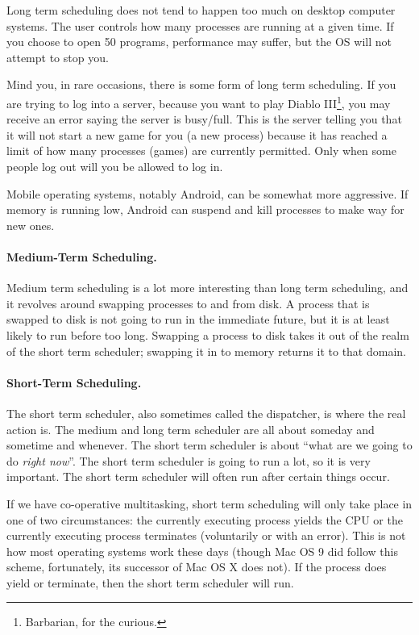 Long term scheduling does not tend to happen too much on desktop computer systems. The user controls how many processes are running at a given time. If you choose to open 50 programs, performance may suffer, but the OS will not attempt to stop you.

Mind you, in rare occasions, there is some form of long term scheduling. If you are trying to log into a server, because you want to play Diablo III\footnote{Barbarian, for the curious.}, you may receive an error saying the server is busy/full. This is the server telling you that it will not start a new game for you (a new process) because it has reached a limit of how many processes (games) are currently permitted. Only when some people log out will you be allowed to log in.

Mobile operating systems, notably Android, can be somewhat more aggressive. If memory is running low, Android can suspend and kill processes to make way for new ones.

\paragraph{Medium-Term Scheduling.}
Medium term scheduling is a lot more interesting than long term scheduling, and it revolves around swapping processes to and from disk. A process that is swapped to disk is not going to run in the immediate future, but it is at least likely to run before too long. Swapping a process to disk takes it out of the realm of the short term scheduler; swapping it in to memory returns it to that domain.

\paragraph{Short-Term Scheduling.}
The short term scheduler, also sometimes called the dispatcher, is where the real action is. The medium and long term scheduler are all about someday and sometime and whenever. The short term scheduler is about ``what are we going to do \textit{right now}''. The short term scheduler is going to run a lot, so it is very important. The short term scheduler will often run after certain things occur. 

If we have co-operative multitasking, short term scheduling will only take place in one of two circumstances: the currently executing process yields the CPU or the currently executing process terminates (voluntarily or with an error). This is not how most operating systems work these days (though Mac OS 9 did follow this scheme, fortunately, its successor of Mac OS X does not). If the process does yield or terminate, then the short term scheduler will run.

